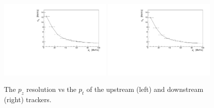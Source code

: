   \begin{figure}[p]
   \begin{center}
     \includegraphics[width=0.49\textwidth, angle=0]{08-Performance/upstream_pz_resolution_pt.pdf}
     \includegraphics[width=0.49\textwidth, angle=0]{08-Performance/downstream_pz_resolution_pt.pdf}
     \caption{\label{fig:PtPzResolKalman} The $p_z$ resolution vs the $p_{t}$ of the upstream (left) and downstream (right) trackers.}
   \end{center}
  \end{figure}
